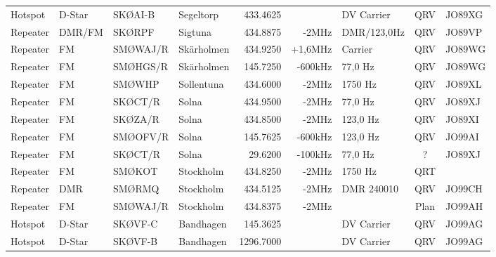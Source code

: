 \begin{longtable}{llllrrlcl}
	Hotspot            & D-Star       & SKØAI-B       & Segeltorp    &          433.4625 &                & DV Carrier      &       QRV       & JO89XG           \\
	Repeater           & DMR/FM       & SKØRPF        & Sigtuna      &          434.8875 &          -2MHz & DMR/123,0Hz     &       QRV       & JO89VP           \\
	Repeater           & FM           & SMØWAJ/R      & Skärholmen   &          434.9250 &        +1,6MHz & Carrier         &       QRV       & JO89WG           \\
	Repeater           & FM           & SMØHGS/R      & Skärholmen   &          145.7250 &        -600kHz & 77,0 Hz         &       QRV       & JO89WG           \\
	Repeater           & FM           & SMØWHP        & Sollentuna   &          434.6000 &          -2MHz & 1750 Hz         &       QRV       & JO89XL           \\
	Repeater           & FM           & SKØCT/R       & Solna        &          434.9500 &          -2MHz & 77,0 Hz         &       QRV       & JO89XJ           \\
	Repeater           & FM           & SKØZA/R       & Solna        &          434.8500 &          -2MHz & 123,0 Hz        &       QRV       & JO89XI           \\
	Repeater           & FM           & SMØOFV/R      & Solna        &          145.7625 &        -600kHz & 123,0 Hz        &       QRV       & JO99AI           \\
	Repeater           & FM           & SKØCT/R       & Solna        &           29.6200 &        -100kHz & 77,0 Hz         &        ?        & JO89XJ           \\
	Repeater           & FM           & SMØKOT        & Stockholm    &          434.8250 &          -2MHz & 1750 Hz         &       QRT       &  \\
	Repeater           & DMR          & SMØRMQ        & Stockholm    &          434.5125 &          -2MHz & DMR 240010      &       QRV       & JO99CH           \\
	Repeater           & FM           & SMØWAJ/R      & Stockholm    &          434.8375 &          -2MHz &                 &      Plan       & JO99AH           \\
	Hotspot            & D-Star       & SKØVF-C       & Bandhagen    &          145.3625 &                & DV Carrier      &       QRV       & JO99AG           \\
	Hotspot            & D-Star       & SKØVF-B       & Bandhagen    &         1296.7000 &                & DV Carrier      &       QRV       & JO99AG           \\

\end{longtable}

